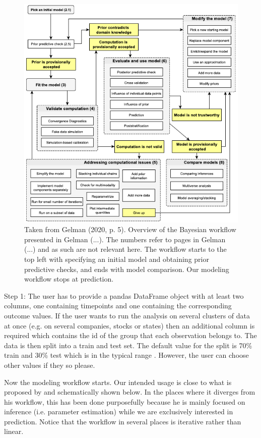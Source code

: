 \documentclass{article}
\begin{document}
\begin{figure}[H]
    \centerline{\includegraphics[scale = 0.5]{images/Gelman.png}}
    \caption{Taken from Gelman (2020, p. 5). Overview of the Bayesian workflow presented in Gelman (...). The numbers refer to pages in Gelman (...) and as such are not relevant here. The workflow starts to the top left with specifying an initial model and obtaining prior predictive checks, and ends with model comparison. Our modeling workflow stops at prediction. }
\end{figure}

Step 1: The user has to provide a pandas DataFrame object with at least two columns, one containing timepoints and one containing the corresponding outcome values. If the user wants to run the analysis on several clusters of data at once (e.g. on several companies, stocks or states) then an additional column is required which contains the id of the group that each observation belongs to. The data is then split into a train and test set. The default value for the split is 70\% train and 30\% test which is in the typical range \cite{Brownlee}. However, the user can choose other values if they so please.

Now the modeling workflow starts. Our intended usage is close to what is proposed by  and schematically shown below. In the places where it diverges from his workflow, this has been done purposefully because he is mainly focused on inference (i.e. parameter estimation) while we are exclusively interested in prediction. Notice that the workflow in several places is iterative rather than linear.
\end{document}
